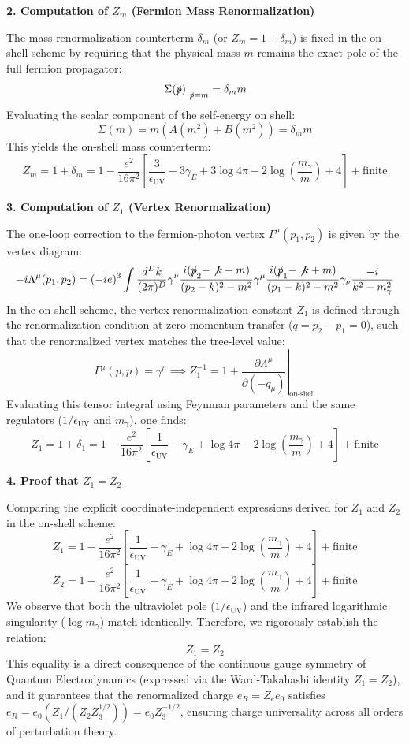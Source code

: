 \textbf{2. Computation of $Z_m$ (Fermion Mass Renormalization)}

The mass renormalization counterterm $\delta_m$ (or $Z_m = 1 + \delta_m$) is fixed in the on-shell scheme by requiring that the physical mass $m$ remains the exact pole of the full fermion propagator:
\[
    \left. \Sigma(\slashed{p}) \right|_{\slashed{p} = m} = \delta_m m
\]
Evaluating the scalar component of the self-energy on shell:
\[
    \Sigma(m) = m \left( A(m^2) + B(m^2) \right) = \delta_m m
\]
This yields the on-shell mass counterterm:
\[
    Z_m = 1 + \delta_m = 1 - \frac{e^2}{16\pi^2} \left[ \frac{3}{\epsilon_{\text{UV}}} - 3\gamma_E + 3\log 4\pi - 2\log\left(\frac{m_\gamma}{m}\right) + 4 \right] + \text{finite}
\]

\textbf{3. Computation of $Z_1$ (Vertex Renormalization)}

The one-loop correction to the fermion-photon vertex $\Gamma^\mu(p_1, p_2)$ is given by the vertex diagram:
\[
    -i\Lambda^\mu(p_1, p_2) = (-ie)^3 \int \frac{d^D k}{(2\pi)^D} \gamma^\nu \frac{i(\slashed{p}_2 - \not{k} + m)}{(p_2-k)^2 - m^2} \gamma^\mu \frac{i(\slashed{p}_1 - \not{k} + m)}{(p_1-k)^2 - m^2} \gamma_\nu \frac{-i}{k^2 - m_\gamma^2}
\]
In the on-shell scheme, the vertex renormalization constant $Z_1$ is defined through the renormalization condition at zero momentum transfer ($q = p_2 - p_1 = 0$), such that the renormalized vertex matches the tree-level value:
\[
    \Gamma^\mu(p, p) = \gamma^\mu \implies Z_1^{-1} = 1 + \left. \frac{\partial \Lambda^\mu}{\partial (-q_\mu)} \right|_{\text{on-shell}}
\]
Evaluating this tensor integral using Feynman parameters and the same regulators ($1/\epsilon_{\text{UV}}$ and $m_\gamma$), one finds:
\[
    Z_1 = 1 + \delta_1 = 1 - \frac{e^2}{16\pi^2} \left[ \frac{1}{\epsilon_{\text{UV}}} - \gamma_E + \log 4\pi - 2\log\left(\frac{m_\gamma}{m}\right) + 4 \right] + \text{finite}
\]

\textbf{4. Proof that $Z_1 = Z_2$}

Comparing the explicit coordinate-independent expressions derived for $Z_1$ and $Z_2$ in the on-shell scheme:
\[
    Z_1 = 1 - \frac{e^2}{16\pi^2} \left[ \frac{1}{\epsilon_{\text{UV}}} - \gamma_E + \log 4\pi - 2\log\left(\frac{m_\gamma}{m}\right) + 4 \right] + \text{finite}
\]
\[
    Z_2 = 1 - \frac{e^2}{16\pi^2} \left[ \frac{1}{\epsilon_{\text{UV}}} - \gamma_E + \log 4\pi - 2\log\left(\frac{m_\gamma}{m}\right) + 4 \right] + \text{finite}
\]
We observe that both the ultraviolet pole ($1/\epsilon_{\text{UV}}$) and the infrared logarithmic singularity ($\log m_\gamma$) match identically. Therefore, we rigorously establish the relation:
\[
    Z_1 = Z_2
\]
This equality is a direct consequence of the continuous gauge symmetry of Quantum Electrodynamics (expressed via the Ward-Takahashi identity $Z_1 = Z_2$), and it guarantees that the renormalized charge $e_R = Z_e e_0$ satisfies $e_R = e_0 (Z_1 / (Z_2 Z_3^{1/2})) = e_0 Z_3^{-1/2}$, ensuring charge universality across all orders of perturbation theory.